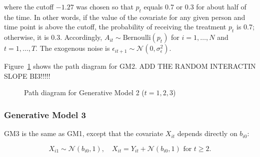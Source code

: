\documentclass[
  12pt,
  a4paper,
]{article}
\begin{document}
where the cutoff \(-1.27\) was chosen so that \(p_t\) equals 0.7 or 0.3
for about half of the time. In other words, if the value of the
covariate for any given person and time point is above the cutoff, the
probability of receiving the treatment \(p_t\) is 0.7; otherwise, it is
0.3. Accordingly, \(A_{it} \sim \text{Bernoulli}(p_t)\) for
\(i = 1, \ldots, N\) and \(t = 1, \ldots, T\). The exogenous noise is
\(\epsilon_{it+1} \sim \mathcal{N}(0, \sigma_\epsilon^2)\).

Figure~\ref{fig-GM2_path} shows the path diagram for GM2. ADD THE RANDOM
INTERACTIN SLOPE BI3!!!!!

\begin{figure}[H]

\caption{\label{fig-GM2_path}Path diagram for Generative Model 2
(\(t = 1, 2, 3\))}


\end{figure}%

\subsubsection{Generative Model 3}\label{generative-model-3}

GM3 is the same as GM1, except that the covariate \(X_{it}\) depends
directly on \(b_{i0}\):

\[
X_{i1} \sim \mathcal{N}(b_{i0}, 1), \quad X_{it} = Y_{it} + \mathcal{N}(b_{i0}, 1) \text{ for } t \geq 2.
\]
\end{document}
